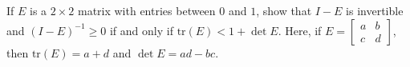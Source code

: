 \documentclass{ximera}
\begin{document}
\begin{problem}\label{prob:i/o_13}
If $E$ is a $2 \times 2$ matrix with entries between $0$ and $1$, show that $I - E$ is invertible and $(I - E)^{-1} \geq 0$ if and only if $\mbox{tr}(E) < 1 + \det E$. Here, if $E = \left[ \begin{array}{rr}
a & b \\
c & d
\end{array} \right]$,
 then $\mbox{tr}(E) = a + d$ and $\det E = ad - bc$.

\end{problem}
\end{document}
